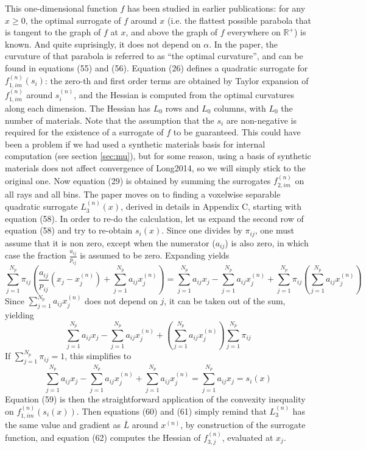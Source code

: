 \documentclass[a4paper, 10pt]{article}
\begin{document}
This one-dimensional function $f$ has been studied in earlier publications: for any $x \geq 0$, the optimal surrogate of $f$ around $x$ (i.e. the flattest possible parabola
that is tangent to the graph of $f$ at $x$, and above the graph of $f$ everywhere on $\mathbb{R}^{+}$) is known. And quite suprisingly, it does not depend on $\alpha$. 
In the paper, the curvature of that parabola is referred to as ``the optimal curvature'',
and can be found in equations (55) and (56).
Equation (26) defines a quadratic surrogate for $f_{1, im}^{(n)}(s_i)$: the zero-th and first order terms are obtained by Taylor expansion of $f_{1, im}^{(n)}$ around $s_i^{(n)}$, 
and the Hessian is computed from the optimal curvatures along each dimension. The Hessian has $L_0$ rows and $L_0$ columns, with $L_0$ the number of materials. Note that
the assumption that the $s_i$ are non-negative is required for the existence of a surrogate of $f$ to be guaranteed. This could have been a problem 
if we had used a synthetic materials basis for internal computation (see section \ref{sec:mu}), but for some reason, using a basis of synthetic materials does not affect convergence 
of Long2014, so we will simply stick to the original one. 
Now equation (29) is obtained by summing the surrogates $f_{2, im}^{(n)}$ on all rays and all bins. 
The paper moves on to finding a voxelwise separable quadratic surrogate $L_3^{(n)}(x)$, derived in details in Appendix C, starting with equation (58). In order to re-do the 
calculation, let us expand the second row of equation (58) and try to re-obtain $s_i(x)$.
Since one divides by $\pi_{ij}$, one must assume that it is non zero, except when the numerator ($a_{ij}$) is also zero, in which case the fraction $\frac{a_{ij}}{p_{ij}} $ is assumed to 
be zero. Expanding yields
\begin{equation*}
 \sum_{j=1}^{N_p} \pi_{ij} \left( \frac{a_{ij}}{p_{ij}} (x_j - x_j^{(n)}) + \sum_{j=1}^{N_p} a_{ij} x_j^{(n)} \right) = \sum_{j=1}^{N_p} a_{ij} x_j - \sum_{j=1}^{N_p} a_{ij} x_j^{(n)} + \sum_{j=1}^{N_p} \pi_{ij} \left( \sum_{j=1}^{N_p} a_{ij} x_j^{(n)} \right)
\end{equation*}
Since $\sum_{j=1}^{N_p} a_{ij} x_j^{(n)}$ does not depend on $j$, it can be taken out of the sum, yielding
\begin{equation*}
 \sum_{j=1}^{N_p} a_{ij} x_j - \sum_{j=1}^{N_p} a_{ij} x_j^{(n)} + \left( \sum_{j=1}^{N_p} a_{ij} x_j^{(n)} \right) \sum_{j=1}^{N_p} \pi_{ij}
\end{equation*}
If $\sum_{j=1}^{N_p} \pi_{ij} = 1$, this simplifies to 
\begin{equation*}
  \sum_{j=1}^{N_p} a_{ij} x_j - \sum_{j=1}^{N_p} a_{ij} x_j^{(n)} + \sum_{j=1}^{N_p} a_{ij} x_j^{(n)} = \sum_{j=1}^{N_p} a_{ij} x_j = s_i(x)
\end{equation*}
Equation (59) is then the straightforward application of the convexity inequality on $f_{1, im}^{(n)} (s_i(x))$. Then equations (60) and (61) simply
remind that $L_3^{(n)}$ has the same value and gradient as $\bar{L}$ around $x^{(n)}$, by construction of the surrogate function, and equation (62) computes
the Hessian of $f_{3,j}^{(n)}$, evaluated at $x_j$.
\end{document}
